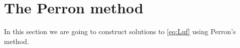 \documentclass[11pt]{article}
\providecommand{\Linf}{\mathcal{L}_{\infty}}
\providecommand{\Lpos}{\mathcal{L}_{\infty}^+}
\providecommand{\Lneg}{\mathcal{L}_{\infty}^-}
\numberwithin{equation}{section}
\theoremstyle{definition}
\begin{document}

\section{The Perron method}\label{sec:Perron}
In this section we are going to construct solutions to \eqref{eq:Luf} using Perron's method. 
\end{document}
